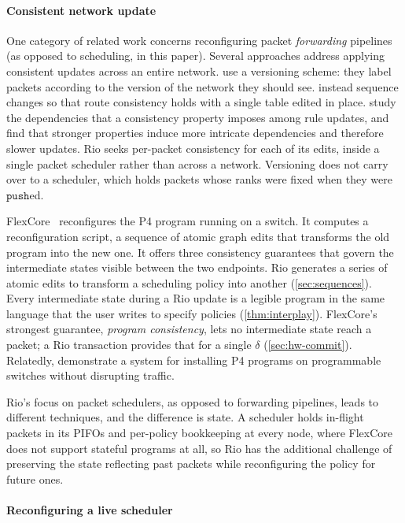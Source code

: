 \documentclass[sigplan,anonymous,review,nonacm]{acmart}
\newcommand{\push}{\ensuremath{\mathtt{push}}}
\begin{document}
\paragraph{Consistent network update}

One category of related work concerns reconfiguring
packet \emph{forwarding} pipelines (as opposed to scheduling, in this paper).
Several approaches address applying consistent updates across an entire network.
\citet{Reitblatt12} use a versioning scheme:
they label packets according to the version of the network they should see.
\citet{Namjoshi24} instead sequence changes so that route consistency holds with a single table edited in place.
\citet{Mahajan13} study the dependencies that a consistency property imposes among rule updates, and find that stronger properties induce more intricate dependencies and therefore slower updates.
Rio seeks per-packet consistency for each of its edits, inside a single packet scheduler rather than across a network.
Versioning does not carry over to a scheduler, which holds packets whose ranks were fixed when they were \push{}ed.

FlexCore~\cite{Xing22} reconfigures the P4 program running on a switch.
It computes a reconfiguration script, a sequence of atomic graph edits that transforms the old program into the new one.
It offers three consistency guarantees that govern the intermediate states visible between the two endpoints.
Rio generates a series of atomic edits to transform a scheduling policy into another (\cref{sec:sequences}).
Every intermediate state during a Rio update is a legible program in the same language that the user writes to specify policies (\cref{thm:interplay}).
FlexCore's strongest guarantee, \emph{program consistency}, lets no intermediate state reach a packet; a Rio transaction provides that for a single \(\delta\) (\cref{sec:hw-commit}).
Relatedly, \citet{Yang24} demonstrate a system for installing P4 programs on programmable switches without disrupting traffic.

Rio's focus on packet schedulers, as opposed to forwarding pipelines, leads to different techniques, and the difference is state.
A scheduler holds in-flight packets in its PIFOs and per-policy bookkeeping at every node, where FlexCore does not support stateful programs at all, so Rio has the additional challenge of preserving the state reflecting past packets while reconfiguring the policy for future ones.

\paragraph{Reconfiguring a live scheduler}
\end{document}
